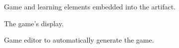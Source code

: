 \documentclass[runningheads,a4paper]{llncs}
\begin{document}
\begin{figure}[htb]
\centering
{}
\hspace*{\fill}
	\caption{Game and learning elements embedded into the artifact.}
\end{figure}

\begin{figure}[htb]
\centering
{}
\caption{The game's display.}
\end{figure}

\begin{figure}[htb]
\centering
{}
\caption{Game editor to automatically generate the game.}
\end{figure}
\end{document}
